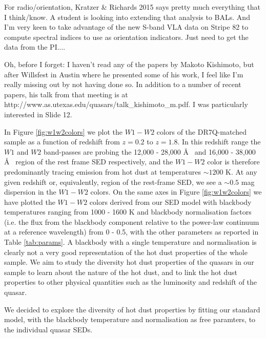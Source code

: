 For radio/orientation, Kratzer \& Richards 2015 says pretty much everything that I think/know.  
A student is looking into extending that analysis to BALs.  
And I'm very keen to take advantage of the new S-band VLA data on Stripe 82 to compute spectral indices to use as orientation indicators.  
Just need to get the data from the PI....

Oh, before I forget: I haven't read any of the papers by Makoto Kishimoto, but after Willsfest in Austin where he presented some of his work, I feel like I'm really missing out by not having done so. In addition to a number of recent papers, his talk from that meeting is at http://www.as.utexas.edu/quasars/talk\_kishimoto\_m.pdf. I was particularly interested in Slide 12.





In Figure \ref{fig:w1w2colors} we plot the $W1 - W2$ colors of the DR7Q-matched sample as a function of redshift from $z=0.2$ to $z=1.8$. In this redshift range the $W1$ and $W2$ band-passes are probing the 12,000 - 28,000 \AA~ and 16,000 - 38,000 \AA~ region of the rest frame SED respectively, and the $W1-W2$ color is therefore predominantly tracing emission from hot dust at temperatures $\sim 1200$ K. At any given redshift or, equivalently, region of the rest-frame SED, we see a $\sim 0.5$ mag dispersion in the $W1-W2$ colors. On the same axes in Figure \ref{fig:w1w2colors} we have plotted the $W1 - W2$ colors derived from our SED model with blackbody temperatures ranging from 1000 - 1600 K and blackbody normalisation factors (i.e. the flux from the blackbody component relative to the power-law continuum at a reference wavelength) from 0 - 0.5, with the other parameters as reported in Table \ref{tab:params}. A blackbody with a single temperature and normalisation is clearly not a very good representation of the hot dust properties of the whole sample. We aim to study the diversity hot dust properties of the quasars in our sample to learn about the nature of the hot dust, and to link the hot dust properties to other physical quantities such as the luminosity and redshift of the quasar. 

We decided to explore the diversity of hot dust properties by fitting our standard model, with the blackbody temperature and normalisation as free paramters, to the individual quasar SEDs. 




